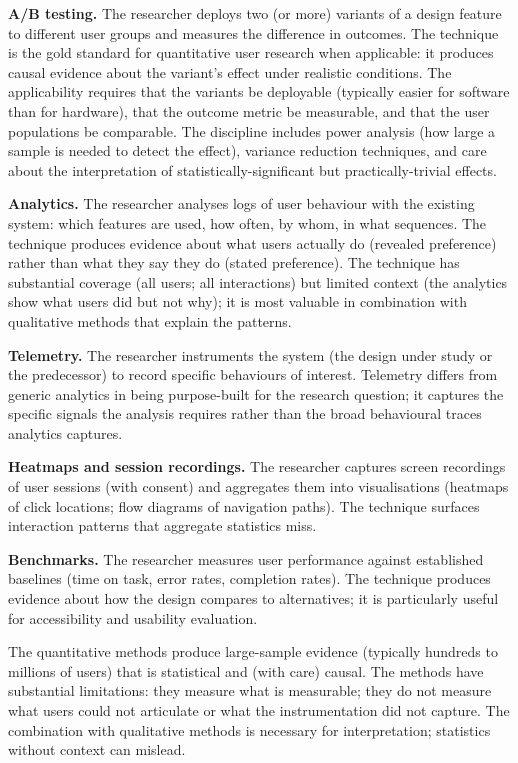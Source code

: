 \textbf{A/B testing.} The researcher deploys two (or more) variants of a design feature to different user groups and measures the difference in outcomes. The technique is the gold standard for quantitative user research when applicable: it produces causal evidence about the variant's effect under realistic conditions. The applicability requires that the variants be deployable (typically easier for software than for hardware), that the outcome metric be measurable, and that the user populations be comparable. The discipline includes power analysis (how large a sample is needed to detect the effect), variance reduction techniques, and care about the interpretation of statistically-significant but practically-trivial effects.

\textbf{Analytics.} The researcher analyses logs of user behaviour with the existing system: which features are used, how often, by whom, in what sequences. The technique produces evidence about what users actually do (revealed preference) rather than what they say they do (stated preference). The technique has substantial coverage (all users; all interactions) but limited context (the analytics show what users did but not why); it is most valuable in combination with qualitative methods that explain the patterns.

\textbf{Telemetry.} The researcher instruments the system (the design under study or the predecessor) to record specific behaviours of interest. Telemetry differs from generic analytics in being purpose-built for the research question; it captures the specific signals the analysis requires rather than the broad behavioural traces analytics captures.

\textbf{Heatmaps and session recordings.} The researcher captures screen recordings of user sessions (with consent) and aggregates them into visualisations (heatmaps of click locations; flow diagrams of navigation paths). The technique surfaces interaction patterns that aggregate statistics miss.

\textbf{Benchmarks.} The researcher measures user performance against established baselines (time on task, error rates, completion rates). The technique produces evidence about how the design compares to alternatives; it is particularly useful for accessibility and usability evaluation.

The quantitative methods produce large-sample evidence (typically hundreds to millions of users) that is statistical and (with care) causal. The methods have substantial limitations: they measure what is measurable; they do not measure what users could not articulate or what the instrumentation did not capture. The combination with qualitative methods is necessary for interpretation; statistics without context can mislead.

